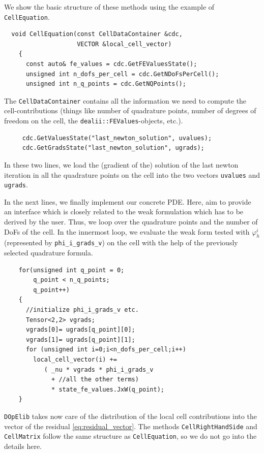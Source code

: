 \documentclass[smallextended]{svjour3}       %
\numberwithin{equation}{section}
\renewcommand{\phi}{\varphi}
\newcommand{\dope}{\texttt{DOpElib}}
\begin{document}
We show the basic structure of these methods using the example of \texttt{CellEquation}.

\begin{lstlisting}
  void CellEquation(const CellDataContainer &cdc,
                    VECTOR &local_cell_vector)
    {
      const auto& fe_values = cdc.GetFEValuesState();
      unsigned int n_dofs_per_cell = cdc.GetNDoFsPerCell();
      unsigned int n_q_points = cdc.GetNQPoints();
\end{lstlisting}
 The \texttt{CellDataContainer} contains all the information we need to compute the cell-contributions (things like number of quadrature points, number of degrees of freedom on the cell, the \texttt{dealii::FEValues}-objects, etc.).
  \begin{lstlisting}
     cdc.GetValuesState("last_newton_solution", uvalues);
     cdc.GetGradsState("last_newton_solution", ugrads);
 \end{lstlisting}
 In these two lines, we load the (gradient of the) solution of the last newton iteration in all the quadrature points on the cell into the two vectors \texttt{uvalues} and \texttt{ugrads}.

In the next lines, we finally implement our concrete PDE. Here, aim to provide 
an interface which is closely related to the weak formulation which 
has to be derived by the user. Thus,
we loop over the quadrature points and the number of DoFs of the cell. In the innermost loop, we evaluate the weak form tested with $\phi_{h}^i$ (represented by \texttt{phi\_i\_grads\_v}) on the cell with the help of the previously selected quadrature formula. 
 \begin{lstlisting}
    for(unsigned int q_point = 0; 
        q_point < n_q_points; 
        q_point++)
    {
      //initialize phi_i_grads_v etc.
      Tensor<2,2> vgrads;
      vgrads[0]= ugrads[q_point][0]; 
      vgrads[1]= ugrads[q_point][1];
      for (unsigned int i=0;i<n_dofs_per_cell;i++)
        local_cell_vector(i) += 
           ( _nu * vgrads * phi_i_grads_v 
             + //all the other terms)
             * state_fe_values.JxW(q_point);
    }
\end{lstlisting}
\dope{} takes now care of the distribution of the local cell contributions into  the vector of the residual \eqref{eq:residual_vector}. The methods \texttt{CellRightHandSide} and \texttt{CellMatrix} follow the same structure as 
\texttt{CellEquation}, so we do not go into the details here.
\end{document}
